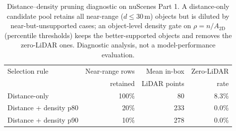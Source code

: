 \begin{table}[t]
  \centering
  \caption{Distance--density pruning diagnostic on nuScenes Part 1. A distance-only candidate pool retains all near-range ($d\le30$\,m) objects but is diluted by near-but-unsupported cases; an object-level density gate on $\rho=n/A_{\mathrm{2D}}$ (percentile thresholds) keeps the better-supported objects and removes the zero-LiDAR ones. Diagnostic analysis, not a model-performance evaluation.}
  \label{tab:cl-redundancy-diagnostic}
  \begin{tabular}{lrrr}
    \toprule
    Selection rule & Near-range rows & Mean in-box & Zero-LiDAR \\
                    & retained        & LiDAR points & rate \\
    \midrule
    Distance-only & 100\% & 80 & 8.3\% \\
    Distance + density p80 & 20\% & 233 & 0.0\% \\
    Distance + density p90 & 10\% & 278 & 0.0\% \\
    \bottomrule
  \end{tabular}
\end{table}
